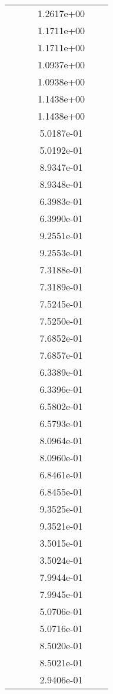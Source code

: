\begin{xltabular}{\textwidth}{r|rS[table-format=1.3e+2]S[table-format=1.4e+2]S[table-format=1.4e+2]S[table-format=-1.5]}
&  &  & 1.2617e+00 & & \\
&  &  & 1.1711e+00 & & \\
&  &  & 1.1711e+00 & & \\
&  &  & 1.0937e+00 & & \\
&  &  & 1.0938e+00 & & \\
&  &  & 1.1438e+00 & & \\
&  &  & 1.1438e+00 & & \\
&  &  & 5.0187e-01 & & \\
&  &  & 5.0192e-01 & & \\
&  &  & 8.9347e-01 & & \\
&  &  & 8.9348e-01 & & \\
&  &  & 6.3983e-01 & & \\
&  &  & 6.3990e-01 & & \\
&  &  & 9.2551e-01 & & \\
&  &  & 9.2553e-01 & & \\
&  &  & 7.3188e-01 & & \\
&  &  & 7.3189e-01 & & \\
&  &  & 7.5245e-01 & & \\
&  &  & 7.5250e-01 & & \\
&  &  & 7.6852e-01 & & \\
&  &  & 7.6857e-01 & & \\
&  &  & 6.3389e-01 & & \\
&  &  & 6.3396e-01 & & \\
&  &  & 6.5802e-01 & & \\
&  &  & 6.5793e-01 & & \\
&  &  & 8.0964e-01 & & \\
&  &  & 8.0960e-01 & & \\
&  &  & 6.8461e-01 & & \\
&  &  & 6.8455e-01 & & \\
&  &  & 9.3525e-01 & & \\
&  &  & 9.3521e-01 & & \\
&  &  & 3.5015e-01 & & \\
&  &  & 3.5024e-01 & & \\
&  &  & 7.9944e-01 & & \\
&  &  & 7.9945e-01 & & \\
&  &  & 5.0706e-01 & & \\
&  &  & 5.0716e-01 & & \\
&  &  & 8.5020e-01 & & \\
&  &  & 8.5021e-01 & & \\
&  &  & 2.9406e-01 & & \\

\end{xltabular}
